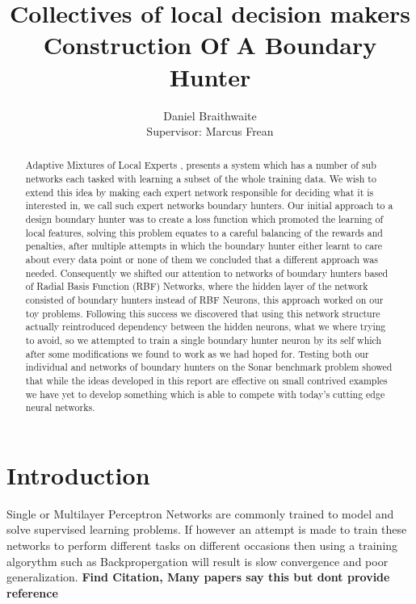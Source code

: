 \documentclass[notitlepage]{report}
\title{%
	Collectives of local decision makers\\
	\large Construction Of A Boundary Hunter
}
\author{Daniel Braithwaite\\[1cm] {Supervisor: Marcus Frean}}
\theoremstyle{definition}
\begin{document}
\begin{titlingpage}
    \maketitle
    \begin{abstract}
    Adaptive Mixtures of Local Experts \cite{jacobs1991adaptive}, presents a system which has a number of sub networks each tasked with learning a subset of the whole training data. We wish to extend this idea by making each expert network responsible for deciding what it is interested in, we call such expert networks boundary hunters. Our initial approach to a design boundary hunter was to create a loss function which promoted the learning of local features, solving this problem equates to a careful balancing of the rewards and penalties, after multiple attempts in which the boundary hunter either learnt to care about every data point or none of them we concluded that a different approach was needed. Consequently we shifted our attention to networks of boundary hunters based of Radial Basis Function (RBF) Networks, where the hidden layer of the network consisted of boundary hunters instead of RBF Neurons, this approach worked on our toy problems. Following this success we discovered that using this network structure actually reintroduced dependency between the hidden neurons, what we where trying to avoid, so we attempted to train a single boundary hunter neuron by its self which after some modifications we found to work as we had hoped for. Testing both our individual and networks of boundary hunters on the Sonar benchmark problem showed that while the ideas developed in this report are effective on small contrived examples we have yet to develop something which is able to compete with today's cutting edge neural networks.
    \end{abstract}
\end{titlingpage}

\chapter{Introduction}

Single or Multilayer Perceptron Networks are commonly trained to model and solve supervised learning problems. If however an attempt is made to train these networks to perform different tasks on different occasions then using a training algorythm such as Backpropergation will result is slow convergence and poor generalization. \textbf{Find Citation, Many papers say this but dont provide reference}
\end{document}
